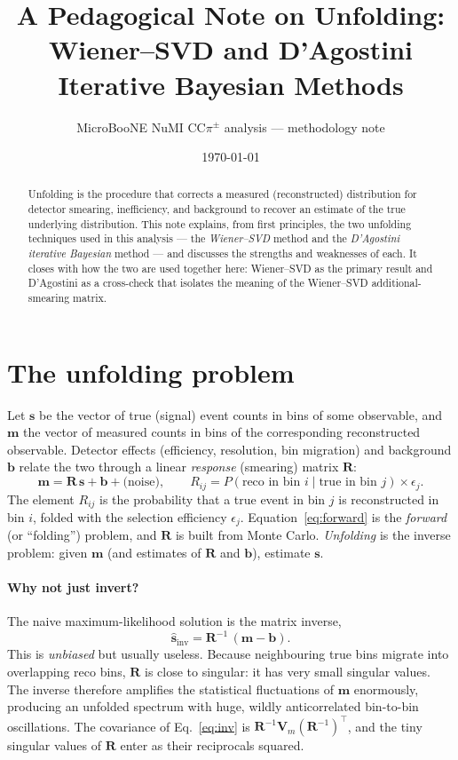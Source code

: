 \documentclass[11pt]{article}
\title{\bf A Pedagogical Note on Unfolding:\\ Wiener--SVD and D'Agostini Iterative Bayesian Methods}
\author{MicroBooNE NuMI CC$\pi^\pm$ analysis --- methodology note}
\date{\today}
\newcommand{\R}{\mathbf{R}}
\newcommand{\vs}{\mathbf{s}}
\newcommand{\vm}{\mathbf{m}}
\newcommand{\vb}{\mathbf{b}}
\newcommand{\shat}{\hat{\mathbf{s}}}
\newcommand{\cov}{\mathbf{V}}
\begin{document}
\maketitle

\begin{abstract}
Unfolding is the procedure that corrects a measured (reconstructed) distribution for
detector smearing, inefficiency, and background to recover an estimate of the true
underlying distribution. This note explains, from first principles, the two unfolding
techniques used in this analysis --- the \emph{Wiener--SVD} method and the
\emph{D'Agostini iterative Bayesian} method --- and discusses the strengths and
weaknesses of each. It closes with how the two are used together here: Wiener--SVD as
the primary result and D'Agostini as a cross-check that isolates the meaning of the
Wiener--SVD additional-smearing matrix.
\end{abstract}

\section{The unfolding problem}

Let $\vs$ be the vector of true (signal) event counts in bins of some observable, and
$\vm$ the vector of measured counts in bins of the corresponding reconstructed
observable. Detector effects (efficiency, resolution, bin migration) and background
$\vb$ relate the two through a linear \emph{response} (smearing) matrix $\R$:
\begin{equation}
  \vm = \R\,\vs + \vb + \text{(noise)}, \qquad
  R_{ij} = P(\text{reco in bin } i \mid \text{true in bin } j)\times\epsilon_j .
  \label{eq:forward}
\end{equation}
The element $R_{ij}$ is the probability that a true event in bin $j$ is reconstructed
in bin $i$, folded with the selection efficiency $\epsilon_j$. Equation~\eqref{eq:forward}
is the \emph{forward} (or ``folding'') problem, and $\R$ is built from Monte Carlo.
\emph{Unfolding} is the inverse problem: given $\vm$ (and estimates of $\R$ and $\vb$),
estimate $\vs$.

\paragraph{Why not just invert?}
The naive maximum-likelihood solution is the matrix inverse,
\begin{equation}
  \shat_{\text{inv}} = \R^{-1}\,(\vm - \vb).
  \label{eq:inv}
\end{equation}
This is \emph{unbiased} but usually useless. Because neighbouring true bins migrate into
overlapping reco bins, $\R$ is close to singular: it has very small singular values. The
inverse therefore amplifies the statistical fluctuations of $\vm$ enormously, producing
an unfolded spectrum with huge, wildly anticorrelated bin-to-bin oscillations. The
covariance of Eq.~\eqref{eq:inv} is $\R^{-1}\cov_m(\R^{-1})^{\!\top}$, and the tiny
singular values of $\R$ enter as their reciprocals squared.
\end{document}
